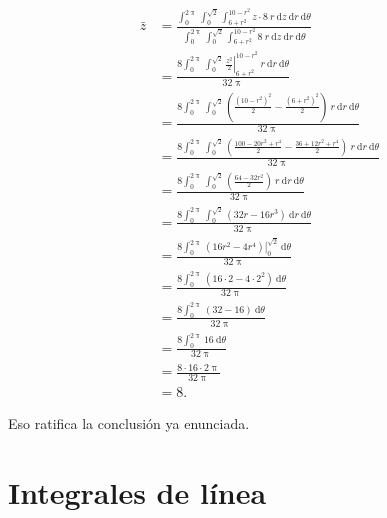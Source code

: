 \documentclass{fmbvecto}
\begin{document}
\begin{problema}
\begin{align*}
    \bar{z} &= \frac{\int_{0}^{2\uppi} \int_{0}^{\sqrt{2}} \int_{6 + r^2}^{10 - r^2} z \cdot 8 \: r \: \mathrm{d}z \: \mathrm{d}r \: \mathrm{d}\theta}{\int_{0}^{2\uppi} \int_{0}^{\sqrt{2}} \int_{6 + r^2}^{10 - r^2} 8 \: r \: \mathrm{d}z \: \mathrm{d}r \: \mathrm{d}\theta} \\
    &= \frac{8 \int_{0}^{2\uppi} \int_{0}^{\sqrt{2}} \left. \frac{z^2}{2} \right\vert_{6 + r^2}^{10 - r^2} \: r \: \mathrm{d}r \: \mathrm{d}\theta}{32\uppi} \\
    &= \frac{8 \int_{0}^{2\uppi} \int_{0}^{\sqrt{2}} \left( \frac{(10 - r^2)^2}{2} - \frac{(6 + r^2)^2}{2} \right) \: r \: \mathrm{d}r \: \mathrm{d}\theta}{32\uppi} \\
    &= \frac{8 \int_{0}^{2\uppi} \int_{0}^{\sqrt{2}} \left( \frac{100 - 20r^2 + r^4}{2} - \frac{36 + 12r^2 + r^4}{2} \right) \: r \: \mathrm{d}r \: \mathrm{d}\theta}{32\uppi} \\
    &= \frac{8 \int_{0}^{2\uppi} \int_{0}^{\sqrt{2}} \left( \frac{64 - 32r^2}{2} \right) \: r \: \mathrm{d}r \: \mathrm{d}\theta}{32\uppi} \\
    &= \frac{8 \int_{0}^{2\uppi} \int_{0}^{\sqrt{2}} (32r - 16r^3) \: \mathrm{d}r \: \mathrm{d}\theta}{32\uppi} \\
    &= \frac{8 \int_{0}^{2\uppi} \left. (16r^2 - 4r^4) \right\vert_{0}^{\sqrt{2}} \: \mathrm{d}\theta}{32\uppi} \\
    &= \frac{8 \int_{0}^{2\uppi} (16 \cdot 2 - 4 \cdot 2^2) \: \mathrm{d}\theta}{32\uppi} \\
    &= \frac{8 \int_{0}^{2\uppi} (32 - 16) \: \mathrm{d}\theta}{32\uppi} \\
    &= \frac{8 \int_{0}^{2\uppi} 16 \: \mathrm{d}\theta}{32\uppi} \\
    &= \frac{8 \cdot 16 \cdot 2\uppi}{32\uppi} \\
    &= 8.
\end{align*}

Eso ratifica la conclusión ya enunciada.

\end{problema}


\section{Integrales de línea}
\end{document}

